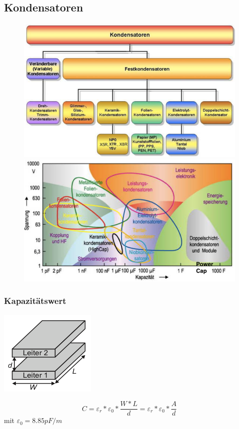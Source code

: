 \subsection{Kondensatoren}
\begin{figure}[h]
\includegraphics[scale=0.4]{pictures/kondensatortypen}
\includegraphics[scale=0.4]{pictures/spannungkondensator}
\end{figure}

\subsubsection{Kapazitätswert}
\begin{minipage}{9cm}
\includegraphics[scale=0.8]{pictures/kapazitaetswert}
\end{minipage}
\begin{minipage}{9cm}
\begin{equation}
C=\varepsilon_{r}*\varepsilon_{0}*\frac{W*L}{d}=\varepsilon_{r}*\varepsilon_{0}*\frac{A}{d}
\end{equation}
mit $\varepsilon_{0}= 8.85 pF/m$
\end{minipage}

